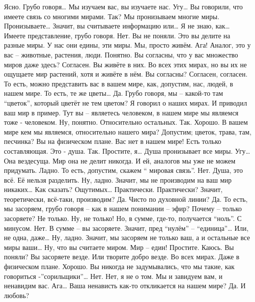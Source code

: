 \documentclass{extbook}
\newcommand{\soul}[1]{{#1}}
\newcommand{\people}[1]{{#1}}
\begin{document}
\people{Ясно. Грубо говоря…}
\soul{Мы изучаем вас, вы изучаете нас.}
\people{Угу…  Вы говорили, что имеете связь со многими мирами. Так?}
\soul{Мы пронизываем многие миры.}
\people{Пронизываете… Значит, вы считываете информацию или… Я не знаю, как… Имеете представление, грубо говоря.}
\soul{Нет. Вы не поняли. Это вы делите на разные миры. У нас они едины, эти миры. Мы, просто живём.}
\people{Ага!}
\soul{Аналог, это у вас – животные, растения, люди.}
\people{Понятно.}
\soul{Вы согласны, что у вас множество миров  даже здесь?}
\people{Согласен.}
\soul{Вы живёте в них. Во всех этих мирах, но вы их не ощущаете мир растений, хотя и живёте в нём. Вы согласны?}
\people{Согласен, согласен. То есть, можно представить вас в вашем мире, как, допустим, нас, людей, в нашем мире. То есть,  те же цветы…}
\soul{Да.}
\people{Грубо говоря, мы – какой-то там ``цветок'', который цветёт не тем цветом?}
\soul{Я говорил о наших мирах. И приводил ваш мир в пример. Тут вы – являетесь человеком, в нашем мире мы являемся тоже - человеком.}
\people{Ну, понятно.}
\soul{Относительно остальных.}
\people{Так. Хорошо. В вашем мире кем мы являемся, относительно нашего мира? Допустим; цветок, трава, там, песчинка?}
\soul{Вы на физическом плане. Вас нет в нашем мире! Есть только составляющая. Это - душа.}
\people{Так. Простите, я…}
\soul{Душа пронизывает все миры.}
\people{Угу…}
\soul{Она вездесуща. Мир она не делит никогда. И ей, аналогов мы уже не можем придумать.}
\people{Ладно. То есть, допустим, скажем `` мировая связь''.}
\soul{Нет. Душа, это всё. Её нельзя разделить.}
\people{Ну, ладно. Значит,  мы не производим на ваш мир никаких… Как сказать? Ощутимых…}
\soul{Практически.}
\people{Практически? Значит, теоретически, всё-таки, производим?}
\soul{Да.}
\people{Чисто по духовной линии?}
\soul{Да.}
\people{То есть, мы засоряем, грубо говоря – как в нашем понимании – эфир?}
\soul{Почему – только засоряете? Не только.}
\people{Ну, не только! Но, в сумме, где-то, получается ``ноль''. С минусом.}
\soul{Нет. В сумме – вы засоряете.}
\people{Значит, пред ``нулём'' – ``единица''… Или, не одна, даже… Ну, ладно. Значит, мы засоряем не только ваш, а и остальные все миры ваши… Ну, что вы считаете миром.}
\people{Мир – един!}
\soul{Простите. Каюсь.}
\soul{Вы поняли?  Вы засоряете везде. Или творите добро везде. Во всех мирах. Даже в физическом плане.}
\people{Хорошо. Вы никогда не задумывались, что мы такие, как говориться -''сорильщики''…}
\soul{Нет.}
\people{Нет, я не о том.}
\soul{Мы и завидуем вам, и ненавидим вас.}
\people{Ага… Ваша ненависть как-то откликается на нашем мире?}
\soul{Да. }
\people{И любовь?}
\end{document}

